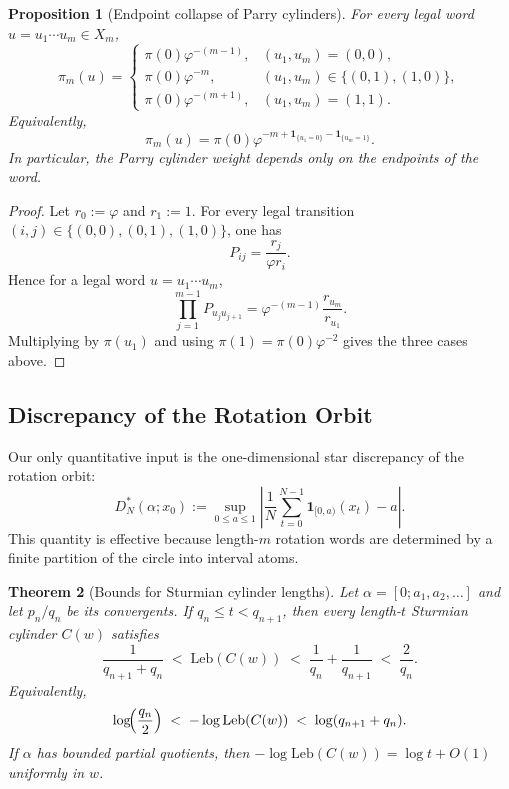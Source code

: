 \documentclass[11pt,letterpaper]{article}
\numberwithin{equation}{section}
\theoremstyle{plain}
\newtheorem{theorem}{Theorem}[section]
\newtheorem{proposition}[theorem]{Proposition}
\theoremstyle{definition}
\theoremstyle{remark}
\newcommand{\leb}{\mathrm{Leb}}
\begin{document}
\begin{proposition}[Endpoint collapse of Parry cylinders]\label{prop:parry-endpoint-collapse}
For every legal word \(u=u_1\cdots u_m\in X_m\),
\[
\pi_m(u)=
\begin{cases}
\pi(0)\varphi^{-(m-1)}, & (u_1,u_m)=(0,0),\\
\pi(0)\varphi^{-m}, & (u_1,u_m)\in\{(0,1),(1,0)\},\\
\pi(0)\varphi^{-(m+1)}, & (u_1,u_m)=(1,1).
\end{cases}
\]
Equivalently,
\[
\pi_m(u)
=
\pi(0)\varphi^{-m+\mathbf{1}_{\{u_1=0\}}-\mathbf{1}_{\{u_m=1\}}}.
\]
In particular, the Parry cylinder weight depends only on the endpoints of the
word.
\end{proposition}

\begin{proof}
Let \(r_0:=\varphi\) and \(r_1:=1\). For every legal transition
\((i,j)\in\{(0,0),(0,1),(1,0)\}\), one has
\[
P_{ij}=\frac{r_j}{\varphi r_i}.
\]
Hence for a legal word \(u=u_1\cdots u_m\),
\[
\prod_{j=1}^{m-1}P_{u_j u_{j+1}}
=
\varphi^{-(m-1)}\frac{r_{u_m}}{r_{u_1}}.
\]
Multiplying by \(\pi(u_1)\) and using \(\pi(1)=\pi(0)\varphi^{-2}\) gives the
three cases above.
\end{proof}

\subsection{Discrepancy of the Rotation Orbit}

Our only quantitative input is the one-dimensional star discrepancy of the
rotation orbit:
\[
D_N^*(\alpha;x_0)
:=
\sup_{0\le a\le 1}
\left|
\frac{1}{N}\sum_{t=0}^{N-1}\mathbf{1}_{[0,a)}(x_t)-a
\right|.
\]
This quantity is effective because length-$m$ rotation words are determined by a
finite partition of the circle into interval atoms.

\begin{theorem}[Bounds for Sturmian cylinder lengths]\label{thm:spg-sturmian-cylinder-measure-continued-fraction-sandwich}
Let $\alpha=[0;a_1,a_2,\dots]$ and let $p_n/q_n$ be its convergents.  If
$q_n\le t<q_{n+1}$, then every length-$t$ Sturmian cylinder $C(w)$ satisfies
\[
\frac{1}{q_{n+1}+q_n}
\;<\;
\leb(C(w))
\;<\;
\frac{1}{q_n}+\frac{1}{q_{n+1}}
\;<\;
\frac{2}{q_n}.
\]
Equivalently,
\[
\log\!\Bigl(\frac{q_n}{2}\Bigr)
\;<\;
-\log\leb(C(w))
\;<\;
\log(q_{n+1}+q_n).
\]
If $\alpha$ has bounded partial quotients, then
$-\log\leb(C(w))=\log t+O(1)$ uniformly in $w$.
\end{theorem}
\end{document}

